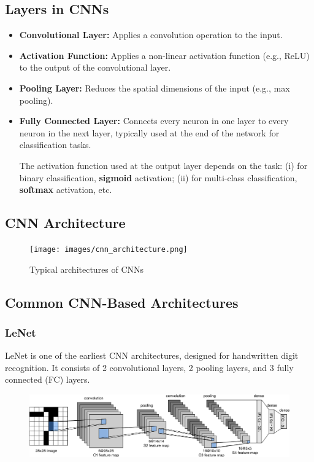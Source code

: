 \subsection*{Layers in CNNs}

\begin{itemize}
  \item \textbf{Convolutional Layer:} Applies a convolution operation to the input.
  \item \textbf{Activation Function:} Applies a non-linear activation function (e.g., ReLU) to the output of the convolutional layer.
  \item \textbf{Pooling Layer:} Reduces the spatial dimensions of the input (e.g., max pooling).
  \item \textbf{Fully Connected Layer:} Connects every neuron in one layer to every neuron in the next layer, typically used at the end of the network for classification tasks.

    The activation function used at the output layer depends on the task: (i) for binary classification, \textbf{sigmoid} activation; (ii) for multi-class classification, \textbf{softmax} activation, etc.
\end{itemize}

\subsection*{CNN Architecture}

\begin{figure}[H]
  \centering
  \texttt{[image: images/cnn\_architecture.png]}
  \caption{Typical architectures of CNNs}
\end{figure}

\subsection*{Common CNN-Based Architectures}

\subsubsection*{LeNet}

LeNet is one of the earliest CNN architectures, designed for handwritten digit recognition. It consists of 2 convolutional layers, 2 pooling layers, and 3 fully connected (FC) layers.

\begin{figure}[H]
  \centering
  \includegraphics[width=\linewidth]{images/lenet.png}
\end{figure}

